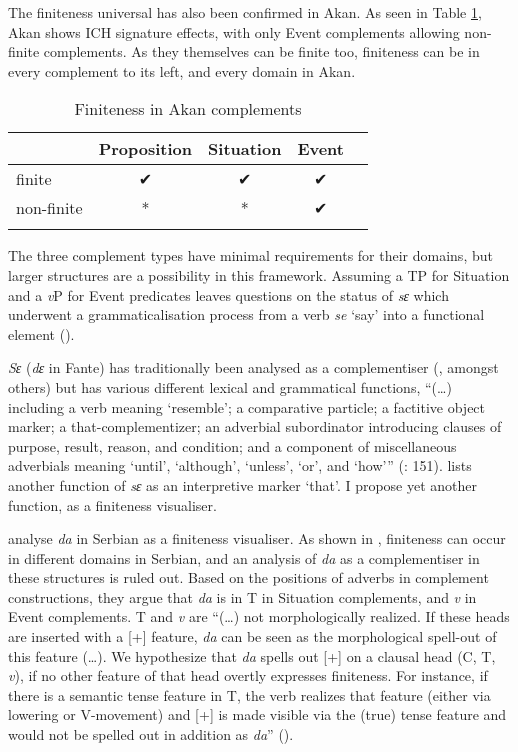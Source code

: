 \documentclass[output=paper]{langscibook}
\begin{document}
The finiteness universal has also been confirmed in Akan. As seen in Table \ref{Pajtab6}, Akan shows ICH signature effects, with only Event complements allowing non-finite complements. As they themselves can be finite too, finiteness can be in every complement to its left, and every domain in Akan. 

\begin{table}
\caption{Finiteness in Akan complements}
\label{Pajtab6}
 \begin{tabular}{l cccc}
  \lsptoprule
            & Proposition & Situation  & Event \\
  \midrule
  finite  & ✔  & ✔    &   ✔    \\
  non-finite & *  & *  & ✔ \\ 
 
  \lspbottomrule
 \end{tabular}
\end{table}

The three complement types have minimal requirements for their domains, but larger structures are a possibility in this framework. Assuming a TP for Situation and a \emph{v}P for Event predicates leaves questions on the status of \emph{sɛ} which underwent a grammaticalisation process from a verb \emph{se} ‘say’ into a functional element (\citealt{osam1996}). 

\emph{Sɛ} (\emph{dɛ} in Fante) has traditionally been analysed as a complementiser (\citealt{lord1993}, \citealt{boadi1972} \citealt{osam1998} amongst others) but has various different lexical and grammatical functions, “(…) including a verb meaning `resemble'; a comparative particle; a factitive object marker; a that-complementizer; an adverbial subordinator introducing clauses of purpose, result, reason, and condition; and a component of miscellaneous adverbials meaning `until', `although', `unless', `or', and `how'” (\citealt{lord1993}: 151). \citet[127]{agyekum2002} lists another function of \emph{sɛ} as an interpretive marker `that'. I propose yet another function, as a finiteness visualiser.

\citet{todorovickwurmbrand2020} analyse \emph{da} in Serbian as a finiteness visualiser. As shown in , finiteness can occur in different domains in Serbian, and an analysis of \emph{da} as a complementiser in these structures is ruled out. Based on the positions of adverbs in complement constructions, they argue that \emph{da} is in T in Situation complements, and \emph{v} in Event complements. T and \emph{v} are “(…) not morphologically realized. If these heads are inserted with a [+] feature, \emph{da} can be seen as the morphological spell-out of this feature (…). We hypothesize that \emph{da} spells out [+] on a clausal head (C, T, \emph{v}), if no other feature of that head overtly expresses finiteness. For instance, if there is a semantic tense feature in T, the verb realizes that feature (either via lowering or V-movement) and [+] is made visible via the (true) tense feature and would not be spelled out in addition as \emph{da}” (\citealt{todorovickwurmbrand2020}).
\end{document}
